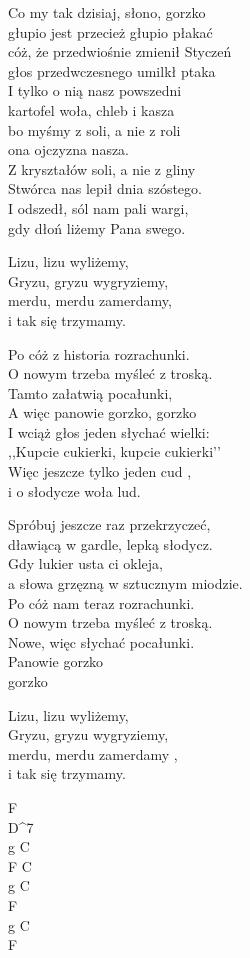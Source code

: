 \begin{text}
    Co my tak dzisiaj, słono, gorzko\\
    głupio jest przecież głupio płakać\\
    cóż, że przedwiośnie zmienił Styczeń\\
    głos przedwczesnego umilkł ptaka\\
    I tylko o nią nasz powszedni\\
    kartofel woła, chleb i kasza\\
    bo myśmy z soli, a nie z roli\\
    ona ojczyzna nasza.\\
    Z kryształów soli, a nie z gliny\\
    Stwórca nas lepił dnia szóstego.\\
    I odszedł, sól nam pali wargi,\\
    gdy dłoń liżemy Pana swego.

    \vin Lizu, lizu wyliżemy,\\
    \vin Gryzu, gryzu wygryziemy,\\
    \vin merdu, merdu zamerdamy,\\
    \vin i tak się trzymamy.

    Po cóż z historia rozrachunki.\\
    O nowym trzeba myśleć z troską.\\
    Tamto załatwią pocałunki,\\
    A więc panowie gorzko, gorzko\\
    I wciąż głos jeden słychać wielki:\\
    ,,Kupcie cukierki, kupcie cukierki’’\\
    Więc jeszcze tylko jeden cud ,\\
    i o słodycze woła lud.

    Spróbuj jeszcze raz przekrzyczeć,\\
    dławiącą w gardle, lepką słodycz.\\
    Gdy lukier usta ci okleja,\\
    a słowa grzęzną w sztucznym miodzie.\\
    Po cóż nam teraz rozrachunki.\\
    O nowym trzeba myśleć z troską.\\
    Nowe, więc słychać pocałunki.\\
    Panowie gorzko\\
    gorzko

    Lizu, lizu wyliżemy,\\
    Gryzu, gryzu wygryziemy,\\
    merdu, merdu zamerdamy ,\\
    i tak się trzymamy.
\end{text}
\begin{chord}
    F\\
    D^7\\
    g C\\
    F C\\
    g C\\
    F\\
    g C\\
    F
\end{chord}